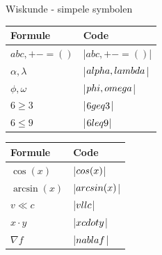 
\def\extraslistsep{\hspace{0.5em}\textcolor{red!80!black}{\vrule width 1pt height 0.6\baselineskip\relax}\hspace{0.5em}}
\def\es#1{\adjustbox{scale=0.8}{#1}}

\begin{frame}{Wiskunde - simpele symbolen}
	\renewcommand{\arraystretch}{1.5}%
	\begin{tabularx}{0.5\textwidth}{ll}
		\toprule
		Formule & Code\\
		\midrule
		$ abc, +- = () $ & \hll|$ abc, + - = ( ) $|\\
		$ \alpha, \lambda $ & \hll|$ \\alpha, \\lambda $| \\
		$ \phi, \omega $ & \hll|$ \\phi, \\omega $| \\
		$ 6\geq 3 $ & \hll|$ 6 \\geq 3 $| \\
		$ 6 \leq 9 $  & \hll|$ 6 \\leq 9 $| \\
		\bottomrule
	\end{tabularx}%
	\begin{tabularx}{0.5\textwidth}{ll}
		\toprule
		Formule & Code\\
		\midrule
		$ \cos(x) $  & \hll|$ \\cos(x) $|\\
		$ \arcsin(x) $ & \hll|$ \\arcsin(x) $|\\
		$ v \ll c $  & \hll|$ v \\ll c $|\\
		$ x \cdot y $ & \hll|$ x \\cdot y $| \\
		$ \nabla f $ & \hll|$ \\nabla f $| \\
		\bottomrule
	\end{tabularx}%
	\par{}
\end{frame}